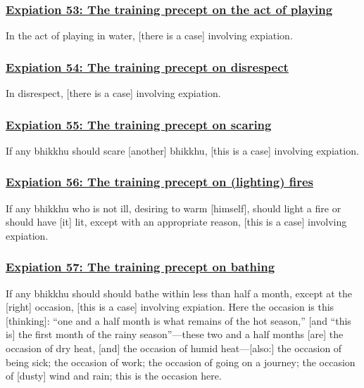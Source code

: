 \subsubsection*{\hyperref[pac53]{Expiation 53: The training precept on the act of playing}}
\label{exp53}
In the act of playing in water, [there is a case] involving expiation.



\subsubsection*{\hyperref[pac54]{Expiation 54: The training precept on disrespect}}
\label{exp54}
In disrespect, [there is a case] involving expiation.



\subsubsection*{\hyperref[pac55]{Expiation 55: The training precept on scaring}}
\label{exp55}
If any bhikkhu should scare [another] bhikkhu, [this is a case] involving expiation.



\subsubsection*{\hyperref[pac56]{Expiation 56: The training precept on (lighting) fires}}
\label{exp56}
If any bhikkhu who is not ill, desiring to warm [himself], should light a fire or should have [it] lit, except with an appropriate reason, [this is a case] involving expiation.



\subsubsection*{\hyperref[pac57]{Expiation 57: The training precept on bathing}}
\label{exp57}
If any bhikkhu should should bathe within less than half a month, except at the [right] occasion, [this is a case] involving expiation. Here the occasion is this [thinking]: ``one and a half month is what remains of the hot season,'' [and ``this is] the first month of the rainy season''—these two and a half months [are] the occasion of dry heat, [and] the occasion of humid heat—[also:] the occasion of being sick; the occasion of work; the occasion of going on a journey; the occasion of [dusty] wind and rain; this is the occasion here.



